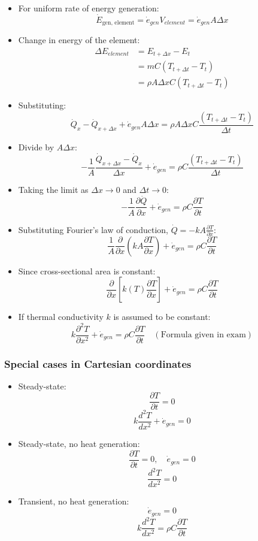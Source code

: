 \documentclass[11pt]{article}
\begin{document}
\begin{itemize}
\item For uniform rate of energy generation:
\[\dot{E}_{\text{gen, element}} = \dot{e}_{gen} V_{element} = \dot{e}_{gen} A \Delta x\]
\item Change in energy of the element:
\begin{align*}
\Delta E_{element} &= E_{t + \Delta x} - E_t \\
&= mC(T_{t + \Delta t} - T_t) \\
&= \rho A \Delta x C (T_{t + \Delta t} - T_t)
\end{align*}
\item Substituting:
\[\dot{Q}_x - \dot{Q}_{x + \Delta x} + \dot{e}_{gen} A \Delta x = \rho A \Delta x C \frac{(T_{t + \Delta t} - T_t)}{\Delta t}\]
\item Divide by \(A \Delta x\):
\[-\frac{1}{A} \frac{\dot{Q}_{x + \Delta x} - \dot{Q}_x}{\Delta x} + \dot{e}_{gen} = \rho C \frac{(T_{t + \Delta t} - T_t)}{\Delta t}\]
\item Taking the limit as \(\Delta x \rightarrow 0\) and \(\Delta t \rightarrow 0\):
\[-\frac{1}{A} \frac{\partial \dot{Q}}{\partial x} + \dot{e}_{gen} = \rho C \frac{\partial T}{\partial t}\]
\item Substituting Fourier's law of conduction, \(\dot{Q} = -kA \frac{\partial T}{\partial x}\):
\[\frac{1}{A} \frac{\partial}{\partial x} \left(kA \frac{\partial T}{\partial x} \right) + \dot{e}_{gen} = \rho C \frac{\partial T}{\partial t}\]
\item Since cross-sectional area is constant:
\[\frac{\partial}{\partial x} \left[k(T) \frac{\partial T}{\partial x} \right] + \dot{e}_{gen} = \rho C \frac{\partial T}{\partial t}\]
\item If thermal conductivity \(k\) is assumed to be constant:
\[k \frac{\partial^2 T}{\partial x^2} + \dot{e}_{gen} = \rho C \frac{\partial T}{\partial t} \quad (\text{Formula given in exam})\]
\end{itemize}
\subsubsection{Special cases in Cartesian coordinates}
\label{sec:org07594be}
\begin{itemize}
\item Steady-state:
\[\frac{\partial T}{\partial t} = 0\]
\[k \frac{d^2 T}{dx^2} + \dot{e}_{gen} = 0\]
\item Steady-state, no heat generation:
\[\frac{\partial T}{\partial t} = 0, \quad \dot{e}_{gen} = 0\]
\[\frac{d^2 T}{dx^2} = 0\]
\item Transient, no heat generation:
\[\dot{e}_{gen} = 0\]
\[k \frac{d^2 T}{dx^2} = \rho C \frac{\partial T}{\partial t}\]
\end{itemize}
\end{document}
